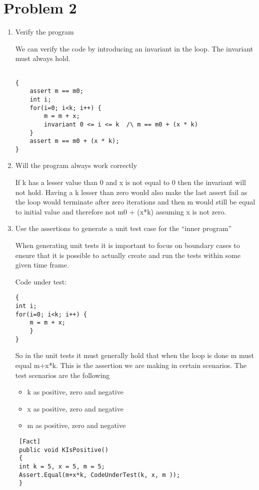 \chapter{Problem 2}
\label{chp:two}

\begin{enumerate}[label=(\alph*)]

\item  Verify the program

We can verify the code by introducing an invariant in the loop. The invariant must always hold.


\begin{lstlisting}

{
	assert m == m0;
	int i;
	for(i=0; i<k; i++) {
		m = m + x;
		invariant 0 <= i <= k  /\ m == m0 + (x * k)
	}
	assert m == m0 + (x * k);
}
\end{lstlisting}


\item Will the program always work correctly

If k has a lesser value than 0 and x is not equal to 0 then the invariant will not hold. Having a k lesser than zero would also make the last assert fail as the loop would terminate after zero iterations and then m would still be equal to initial value and therefore not m0 + (x*k) assuming x is not zero.


\item  Use the assertions to generate a unit test case for the “inner program”

When generating unit tests it is important to focus on boundary cases to ensure that it is possible to actually create and run the tests within some given time frame.

Code under test:
\begin{lstlisting}
{
int i;
for(i=0; i<k; i++) {
	m = m + x;
	}
}
\end{lstlisting}

So in the unit tests it must generally hold that when the loop is done m must equal m+x*k. This is the assertion we are making in certain scenarios. The test scenarios are the following
\begin{itemize}
	\item k as positive, zero and negative
	\item x as positive, zero and negative
	\item m as positive, zero and negative
\end{itemize}

\begin{lstlisting}
 [Fact]
 public void KIsPositive()
 {
 int k = 5, x = 5, m = 5;
 Assert.Equal(m+x*k, CodeUnderTest(k, x, m ));
 }
 

\end{lstlisting}
\end{enumerate}
